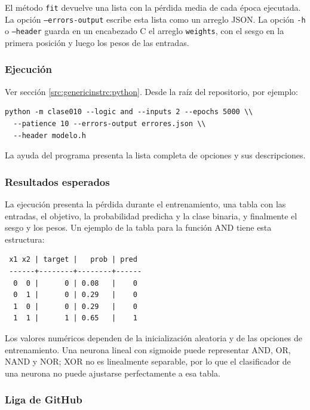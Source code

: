 \documentclass{article}[12pt,a4paper]
\begin{document}
El método \texttt{fit} devuelve una lista con la pérdida media de
cada época ejecutada. La opción \texttt{--errors-output} escribe esta
lista como un arreglo JSON. La opción \texttt{-h} o
\texttt{--header} guarda en un encabezado C el arreglo
\texttt{weights}, con el sesgo en la primera posición y luego los
pesos de las entradas.

\subsubsection{Ejecución}

Ver sección \ref{src:genericinstrc:python}. Desde la raíz del repositorio, por
ejemplo:

\begin{verbatim}
python -m clase010 --logic and --inputs 2 --epochs 5000 \\
  --patience 10 --errors-output errores.json \\
  --header modelo.h
\end{verbatim}

La ayuda del programa presenta la lista completa de opciones y sus descripciones.

\subsubsection{Resultados esperados}

La ejecución presenta la pérdida durante el entrenamiento, una tabla con las
entradas, el objetivo, la probabilidad predicha y la clase binaria, y finalmente
el sesgo y los pesos. Un ejemplo de la tabla para la función AND tiene esta
estructura:

\begin{verbatim}
 x1 x2 | target |   prob | pred
 ------+--------+--------+------
  0  0 |      0 | 0.08   |    0
  0  1 |      0 | 0.29   |    0
  1  0 |      0 | 0.29   |    0
  1  1 |      1 | 0.65   |    1
\end{verbatim}

Los valores numéricos dependen de la inicialización aleatoria y de las opciones
de entrenamiento. Una neurona lineal con sigmoide puede representar AND, OR,
NAND y NOR; XOR no es linealmente separable, por lo que el clasificador de una
neurona no puede ajustarse perfectamente a esa tabla.

\subsubsection{Liga de \textbf{GitHub}}
\end{document}
